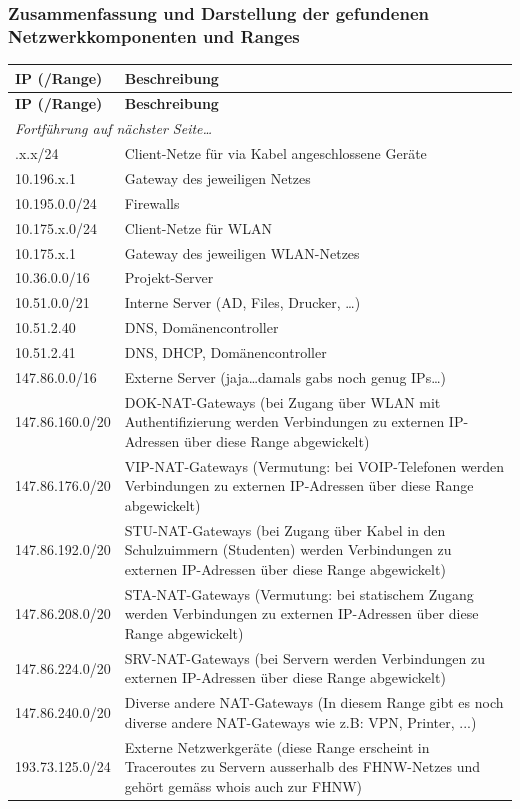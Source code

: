 \documentclass[a4paper,11pt]{scrartcl}
\begin{document}
\subsubsection{Zusammenfassung und Darstellung der gefundenen Netzwerkkomponenten und Ranges}
\begin{longtable}{p{3cm}|p{9cm}}
	\textbf{IP (/Range)} & \textbf{Beschreibung} \\
	\hline
	\endfirsthead
	\textbf{IP (/Range)} & \textbf{Beschreibung} \\
	\hline
	\endhead
	\hline
	\multicolumn{2}{l}{\textit{Fortführung auf nächster Seite\ldots}} \\
	\endfoot
	\endlastfoot
	10.196.x.x/24	&	Client-Netze für via Kabel angeschlossene Geräte \\
	10.196.x.1		&	Gateway des jeweiligen Netzes \\
	10.195.0.0/24	&	Firewalls \\
	10.175.x.0/24	&	Client-Netze für WLAN \\
	10.175.x.1		&	Gateway des jeweiligen WLAN-Netzes \\
	10.36.0.0/16	&	Projekt-Server \\
	10.51.0.0/21	&	Interne Server (AD, Files, Drucker, \ldots) \\
	10.51.2.40		&	DNS, Domänencontroller \\
	10.51.2.41		&	DNS, DHCP, Domänencontroller \\
	147.86.0.0/16	&	Externe Server (jaja\ldots damals gabs noch genug IPs\ldots)\\
	147.86.160.0/20	&	DOK-NAT-Gateways (bei Zugang über WLAN mit Authentifizierung werden Verbindungen zu externen IP-Adressen über diese Range abgewickelt)\\
	147.86.176.0/20	&	VIP-NAT-Gateways (Vermutung: bei VOIP-Telefonen werden Verbindungen zu externen IP-Adressen über diese Range abgewickelt)\\
	147.86.192.0/20	&	STU-NAT-Gateways (bei Zugang über Kabel in den Schulzuimmern (Studenten) werden Verbindungen zu externen IP-Adressen über diese Range abgewickelt)\\
	147.86.208.0/20	&	STA-NAT-Gateways (Vermutung: bei statischem Zugang werden Verbindungen zu externen IP-Adressen über diese Range abgewickelt)\\
	147.86.224.0/20	&	SRV-NAT-Gateways (bei Servern werden Verbindungen zu externen IP-Adressen über diese Range abgewickelt)\\
	147.86.240.0/20	&	Diverse andere NAT-Gateways (In diesem Range gibt es noch diverse andere NAT-Gateways wie z.B: VPN, Printer, ...)\\
	193.73.125.0/24	&	Externe Netzwerkgeräte (diese Range erscheint in Traceroutes zu Servern ausserhalb des FHNW-Netzes und gehört gemäss whois auch zur FHNW)
\end{longtable}
\end{document}
